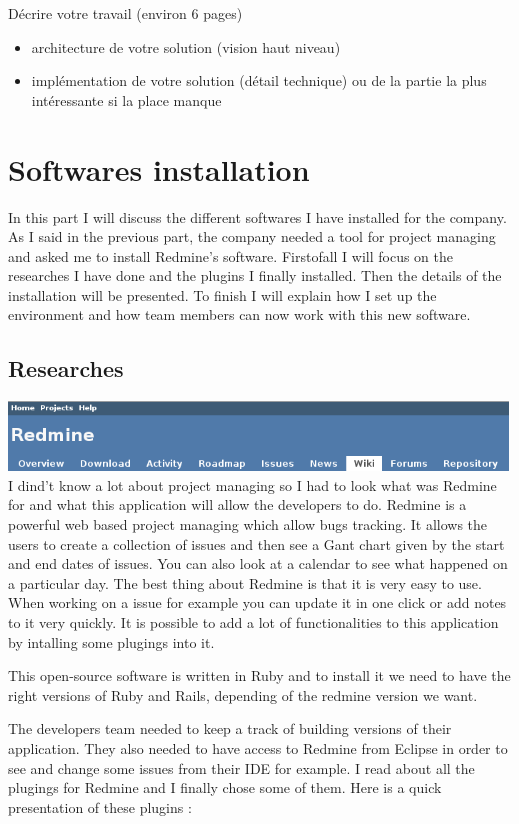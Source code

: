 

Décrire votre travail (environ 6 pages)
\begin{itemize}
	\item architecture de votre solution (vision haut niveau)
	\item implémentation de votre solution (détail technique) ou de la partie la plus intéressante si la place manque

\end{itemize}
\newpage
\section{Softwares installation}
In this part I will discuss the different softwares I have installed for the company.
As I said in the previous part, the company needed a tool for project managing and asked
me to install Redmine's software. 
Firstofall I will focus on the researches I have done and the plugins I finally
installed. 
Then the details of the installation will be presented. To finish I will explain how I set
up the environment and how team members can now work with this new software. 
\subsection{Researches}

\includegraphics[width=\textwidth, height=70px]{Images/redmine.png}
\newline
\\
I dind't know a lot about project managing so I had to look what was Redmine for and what
 this application will allow the developers to do.  
Redmine is a powerful web based project managing which allow bugs tracking. It allows the
users to create a collection of issues and then see a Gant chart given by the start and 
end dates of issues. You can also look at a calendar to see what happened on a particular
day. The best thing about Redmine is that it is very easy to use. When working on a issue
for example you can update it in one click or add notes to it very quickly. 
 It is possible to add a lot of functionalities to this application by intalling some 
 plugings into it. 

This open-source software is written in Ruby and to install it we need to have the right versions of
Ruby and Rails, depending of the redmine version we want.  

 The developers team needed to keep a track of building versions of their application.
 They also needed to have access to Redmine from Eclipse in order to see and change 
 some issues from their IDE for example. 
I read about all the plugings for Redmine and I finally chose some of them. 
Here is a quick presentation of these plugins :  

	 

\newpage


\cleardoublepage


